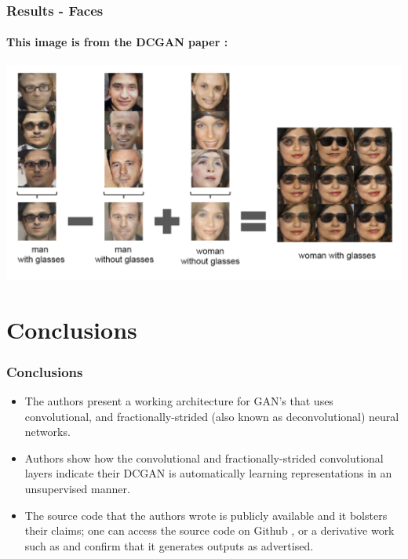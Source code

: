 \documentclass{beamer}
\begin{document}
\begin{frame}[allowframebreaks]
\frametitle{Results - Faces}
\framesubtitle{This image is from the DCGAN paper \cite{repLearnDcgan}:}
\includegraphics[scale=0.25]{woman-with-glasses}
\end{frame}


\section{Conclusions}
\begin{frame}[allowframebreaks]
\frametitle{Conclusions}
\begin{itemize}
\item The authors present a working architecture for GAN's that uses
convolutional, and fractionally-strided (also known as deconvolutional) neural
networks.
\item Authors show how the convolutional and fractionally-strided convolutional  
layers indicate their DCGAN is automatically learning representations in an 
unsupervised manner.
\item The source code that the authors wrote is publicly available and it
bolsters their claims; one can access the source code on Github
\cite{dcganCode}, or a derivative work such as \cite{dcganTf} and confirm
that it generates outputs as advertised.
\end{itemize}
\end{frame}

\end{document}
